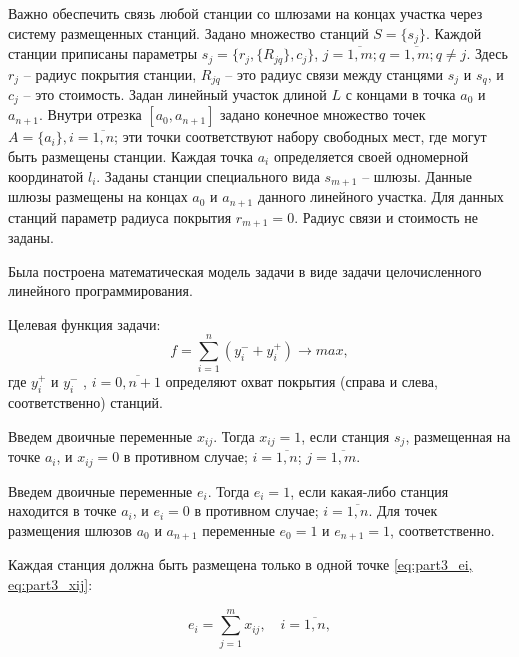 Важно обеспечить связь любой станции со шлюзами на концах участка через систему размещенных станций. Задано множество станций $S = \{s_j\}$. Каждой станции приписаны параметры $s_j = \{r_j, \{R_{jq}\}, c_j \}$, $j = \overline{1,m}; q = \overline{1,m}; q \neq j$. Здесь $r_j$ -- радиус покрытия станции, $R_{jq}$ -- это радиус связи между станцями $s_j$ и $s_q$, и $c_j$ -- это стоимость. Задан линейный участок длиной $L$ с концами в точка $a_0$ и $a_{n+1}$. Внутри  отрезка $[a_0, a_{n+1}]$ задано конечное множество точек $A=\{a_i\}, i=\overline{1,n}$; эти точки соответствуют набору свободных мест, где могут быть размещены станции. Каждая точка $a_i$ определяется своей одномерной координатой $l_i$. Заданы станции специального вида $s_{m+1}$ -- шлюзы. Данные шлюзы размещены на концах $a_0$ и $a_{n+1}$ данного линейного участка. Для данных станций параметр радиуса покрытия $r_{m+1}=0$. Радиус связи и стоимость не заданы.

Была построена математическая модель задачи в виде задачи целочисленного линейного программирования. 

Целевая функция задачи:
\begin{equation}
    \label{eq:part3_objective_function}
    f =  \sum\limits_{i=1}^n (y_i^- + y_i^+) \rightarrow max,
  \end{equation}
где $y_i^+$ и $y_i^-$ , $i= \overline{0,n+1}$ определяют охват покрытия (справа и слева, соответственно) станций.


Введем двоичные переменные $x_{ij}$. Тогда $x_{ij}=1$, если станция $s_j$, размещенная на точке $a_i$, и $x_{ij}=0$ в противном случае; $i= \overline{1, n}$; $j = \overline{1,m}$.

Введем двоичные переменные $ e_i $. Тогда $ e_i = 1 $, если какая-либо станция находится в точке $ a_i $, и $ e_i = 0$  в противном случае; $ i = \overline {1, n} $. Для точек размещения шлюзов $ a_0 $ и $a_{n + 1}$ переменные $ e_0 = 1 $ и $ e_{n + 1} =1 $, соответственно.




Каждая станция должна быть размещена только в одной точке \cref{eq:part3_ei, eq:part3_xij}:

\begin{equation}
    \label{eq:part3_ei}
    e_i =  \sum\limits_{j=1}^m x_{ij}, \quad i = \overline{1,n},
  \end{equation}

